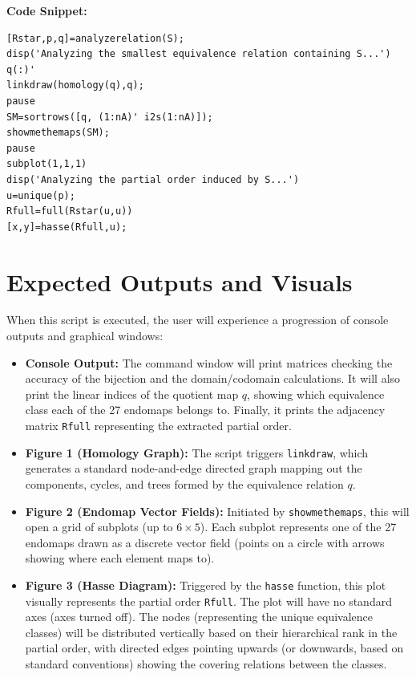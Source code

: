 \textbf{Code Snippet:}
\begin{lstlisting}
[Rstar,p,q]=analyzerelation(S);
disp('Analyzing the smallest equivalence relation containing S...')
q(:)'
linkdraw(homology(q),q);
pause
SM=sortrows([q, (1:nA)' i2s(1:nA)]);
showmethemaps(SM);
pause
subplot(1,1,1)
disp('Analyzing the partial order induced by S...')
u=unique(p);
Rfull=full(Rstar(u,u))
[x,y]=hasse(Rfull,u);
\end{lstlisting}

\newpage
\section{Expected Outputs and Visuals}

When this script is executed, the user will experience a progression of console outputs and graphical windows:

\begin{itemize}
    \item \textbf{Console Output:} The command window will print matrices checking the accuracy of the bijection and the domain/codomain calculations. It will also print the linear indices of the quotient map $q$, showing which equivalence class each of the 27 endomaps belongs to. Finally, it prints the adjacency matrix \texttt{Rfull} representing the extracted partial order.
    
    \item \textbf{Figure 1 (Homology Graph):} The script triggers \texttt{linkdraw}, which generates a standard node-and-edge directed graph mapping out the components, cycles, and trees formed by the equivalence relation $q$. 
    
    \item \textbf{Figure 2 (Endomap Vector Fields):} Initiated by \texttt{showmethemaps}, this will open a grid of subplots (up to $6 \times 5$). Each subplot represents one of the 27 endomaps drawn as a discrete vector field (points on a circle with arrows showing where each element maps to).
    
    \item \textbf{Figure 3 (Hasse Diagram):} Triggered by the \texttt{hasse} function, this plot visually represents the partial order \texttt{Rfull}. The plot will have no standard axes (axes turned off). The nodes (representing the unique equivalence classes) will be distributed vertically based on their hierarchical rank in the partial order, with directed edges pointing upwards (or downwards, based on standard conventions) showing the covering relations between the classes.
\end{itemize}

